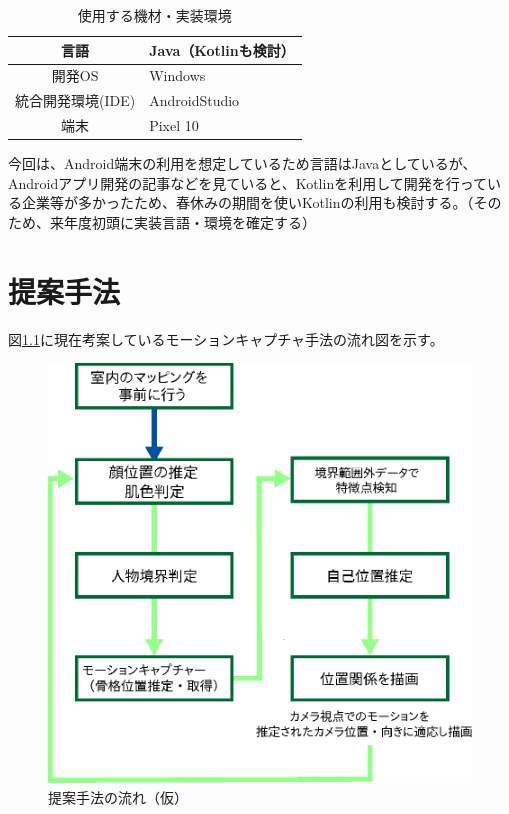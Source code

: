 \documentclass[11pt]{jreport}
\begin{document}
\begin{center}
\begin{table}[H]
\caption{使用する機材・実装環境}
\label{jikkoukannkyou}
\center
\begin{tabular}{|c||l|} \hline
言語 & Java（Kotlinも検討） \\ \hline 
開発OS & Windows  \\ \hline
統合開発環境(IDE) & AndroidStudio \\ \hline
端末 & Pixel 10 \\ \hline
\end{tabular}
\end{table}
\end{center}

今回は、Android端末の利用を想定しているため言語はJavaとしているが、Androidアプリ開発の記事などを見ていると、Kotlinを利用して開発を行っている企業等が多かったため、春休みの期間を使いKotlinの利用も検討する。（そのため、来年度初頭に実装言語・環境を確定する）

\chapter{提案手法}\label{chap:fig-tab-exp}
図\ref{method-fig}に現在考案しているモーションキャプチャ手法の流れ図を示す。

\vspace{20pt}
\begin{figure}[htbp]
  \centering
  \includegraphics[scale = 0.8]{fig/memo2.eps}
  \caption{提案手法の流れ（仮）}
  \label{method-fig}
\end{figure}
\end{document}
